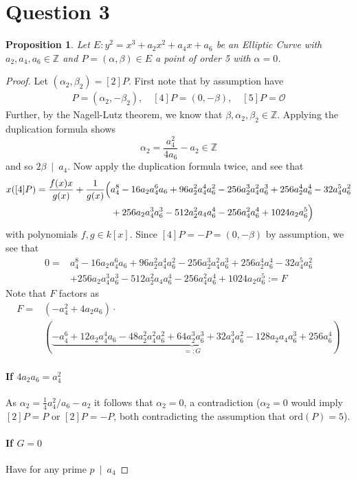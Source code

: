 \documentclass{scrartcl}
\newcommand{\Z}{\mathbb{Z}}
\renewcommand{\O}{\mathcal{O}}
\newcommand{\divides}{\ \mid \ }
\newtheorem{prop}{Proposition}
\theoremstyle{definition}
\begin{document}
\section*{Question 3}
\begin{prop}
    Let $E: y^2 = x^3 + a_2 x^2 + a_4 x + a_6$ be an Elliptic Curve with $a_2, a_4, a_6 \in \Z$ and $P = (\alpha, \beta) \in E$ a point of order 5 with $\alpha = 0$.
\end{prop}
\begin{proof}
    Let $(\alpha_2, \beta_2) = [2]P$.
    First note that by assumption have
    \begin{align*}
        [3]P = (\alpha_2, -\beta_2), \quad [4]P = (0, -\beta), \quad [5]P = \O
    \end{align*}
    Further, by the Nagell-Lutz theorem, we know that $\beta, \alpha_2, \beta_2 \in \Z$.
    Applying the duplication formula shows
    \begin{equation*}
        \alpha_2 = \frac {a_4^2} {4a_6} - a_2 \in \Z
    \end{equation*}
    and so $2\beta \divides a_4$.
    Now apply the duplication formula twice, and see that
    \begin{align*}
        x([4]P) = \frac {f(x)x} {g(x)} + \frac 1 {g(x)} \Bigl( &a_4^8 - 16a_2a_4^6a_6 + 96a_2^2a_4^4a_6^2 - 256a_2^3a_4^2a_6^3 + 256a_2^4a_6^4 - 32a_4^5a_6^2 \\
        &+ 256a_2a_4^3a_6^3 - 512a_2^2a_4a_6^4 - 256a_4^2a_6^4 + 1024a_2a_6^5 \Bigr)
    \end{align*}
    with polynomials $f, g \in k[x]$.
    Since $[4]P = -P = (0, -\beta)$ by assumption, we see that
    \begin{align*}
        0 = &a_4^8 - 16a_2a_4^6a_6 + 96a_2^2a_4^4a_6^2 - 256a_2^3a_4^2a_6^3 + 256a_2^4a_6^4 - 32a_4^5a_6^2 \\
        &+ 256a_2a_4^3a_6^3 - 512a_2^2a_4a_6^4 - 256a_4^2a_6^4 + 1024a_2a_6^5 := F
    \end{align*}
    Note that $F$ factors as
    \begin{align*}
        F =& (-a_4^2 + 4a_2a_6) \cdot \\
        &(\underbrace{-a_4^6 + 12a_2a_4^4a_6 - 48a_2^2a_4^2a_6^2 + 64a_2^3a_6^3 + 32a_4^3a_6^2 - 128a_2a_4a_6^3 + 256a_6^4}_{=: G})
    \end{align*}
    \paragraph{If $4a_2a_6 = a_4^2$} As $\alpha_2 = \frac 1 4 a_4^2/a_6 - a_2$ it follows that $\alpha_2 = 0$, a contradiction ($\alpha_2 = 0$ would imply $[2]P = P$ or $[2]P = -P$, both contradicting the assumption that $\mathrm{ord}(P) = 5$).
    \paragraph{If $G = 0$} Have for any prime $p \divides a_4$
\end{proof}
\end{document}
